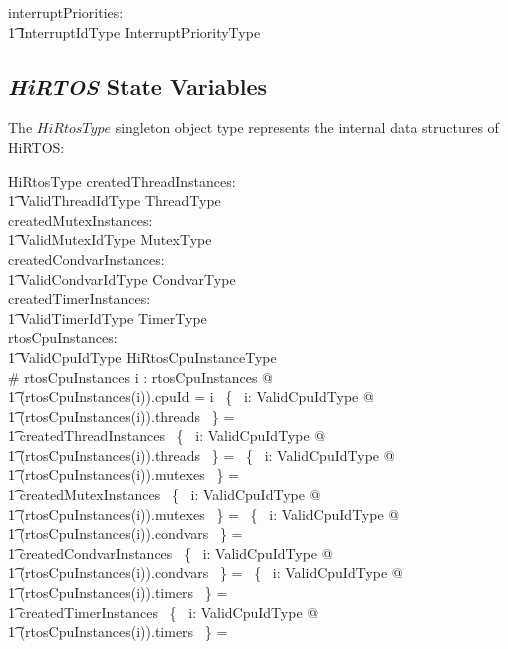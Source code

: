 \documentclass[11pt,letterpaper,twoside,openany]{book}
\begin{document}
\begin{axdef}
   interruptPriorities: \\
   \t1 InterruptIdType \fun InterruptPriorityType
\end{axdef}

\subsection{\emph{HiRTOS} State Variables}

The $HiRtosType$ singleton object type represents the internal data
structures of HiRTOS:

\begin{schema}{HiRtosType}
    createdThreadInstances: \\
    \t1 ValidThreadIdType \finj ThreadType \\
    createdMutexInstances: \\
    \t1 ValidMutexIdType \finj MutexType \\
    createdCondvarInstances: \\
    \t1 ValidCondvarIdType \finj CondvarType \\
    createdTimerInstances: \\
    \t1 ValidTimerIdType \finj TimerType \\
    rtosCpuInstances: \\
    \t1 ValidCpuIdType \finj HiRtosCpuInstanceType \\
\where
    \# rtosCpuInstances 
\also
    \forall i : \dom rtosCpuInstances @ \\
\t1   (rtosCpuInstances(i)).cpuId = i
\also
    \bigcup~\{~ i: ValidCpuIdType @ \\
\t1    (rtosCpuInstances(i)).threads ~\} = \\
\t1    createdThreadInstances
\also
    \bigcap~\{~ i: ValidCpuIdType @ \\
\t1    (rtosCpuInstances(i)).threads ~\} = \emptyset
\also
    \bigcup~\{~ i: ValidCpuIdType @ \\
\t1    (rtosCpuInstances(i)).mutexes ~\} = \\
\t1    createdMutexInstances
\also
    \bigcap~\{~ i: ValidCpuIdType @ \\
\t1    (rtosCpuInstances(i)).mutexes ~\} = \emptyset
\also
    \bigcup~\{~ i: ValidCpuIdType @ \\
\t1    (rtosCpuInstances(i)).condvars ~\} = \\
\t1    createdCondvarInstances
\also
    \bigcap~\{~ i: ValidCpuIdType @ \\
\t1    (rtosCpuInstances(i)).condvars ~\} = \emptyset
\also
    \bigcup~\{~ i: ValidCpuIdType @ \\
\t1    (rtosCpuInstances(i)).timers ~\} = \\
\t1    createdTimerInstances
\also
    \bigcap~\{~ i: ValidCpuIdType @ \\
\t1    (rtosCpuInstances(i)).timers ~\} = \emptyset
\end{schema}
\end{document}
